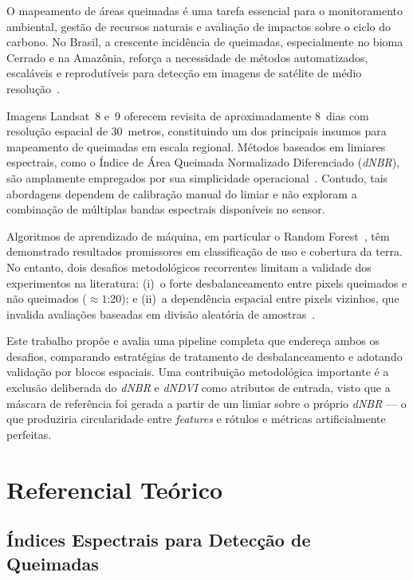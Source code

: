 \documentclass[conference]{IEEEtran}
\begin{document}
O mapeamento de áreas queimadas é uma tarefa essencial para o monitoramento
ambiental, gestão de recursos naturais e avaliação de impactos sobre o ciclo
do carbono. No Brasil, a crescente incidência de queimadas, especialmente no
bioma Cerrado e na Amazônia, reforça a necessidade de métodos automatizados,
escaláveis e reprodutíveis para detecção em imagens de satélite de médio
resolução~\cite{b1}.

Imagens Landsat~8 e~9 oferecem revisita de aproximadamente 8~dias com resolução
espacial de 30~metros, constituindo um dos principais insumos para mapeamento
de queimadas em escala regional. Métodos baseados em limiares espectrais, como
o Índice de Área Queimada Normalizado Diferenciado (\textit{dNBR}), são amplamente
empregados por sua simplicidade operacional~\cite{b2}. Contudo, tais abordagens
dependem de calibração manual do limiar e não exploram a combinação de múltiplas
bandas espectrais disponíveis no sensor.

Algoritmos de aprendizado de máquina, em particular o Random
Forest~\cite{b3}, têm demonstrado resultados promissores em classificação de
uso e cobertura da terra. No entanto, dois desafios metodológicos recorrentes
limitam a validade dos experimentos na literatura:
(i)~o forte desbalanceamento entre pixels queimados e não queimados
($\approx1$:20); e
(ii)~a dependência espacial entre pixels vizinhos, que invalida avaliações
baseadas em divisão aleatória de amostras~\cite{b4}.

Este trabalho propõe e avalia uma pipeline completa que endereça ambos os
desafios, comparando estratégias de tratamento de desbalanceamento e adotando
validação por blocos espaciais. Uma contribuição metodológica importante é
a exclusão deliberada do \textit{dNBR} e \textit{dNDVI} como atributos de
entrada, visto que a máscara de referência foi gerada a partir de um limiar
sobre o próprio \textit{dNBR} — o que produziria circularidade entre
\textit{features} e rótulos e métricas artificialmente perfeitas.

\section{Referencial Teórico}

\subsection{Índices Espectrais para Detecção de Queimadas}
\end{document}
